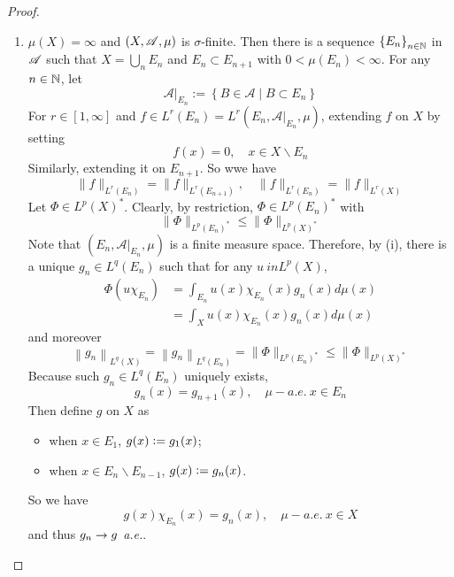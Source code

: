 \begin{proof}
\begin{itemize}
\begin{enumerate}[label=(\roman*)]
			\item $\mu(X) = \infty$ and $(X,\mathscr{A}, \mu)$ is $\sigma$-finite. Then there is a sequence $\left\{E_n\right\}_{n \in \mathbb{N}}$ in $\mathscr{A}$ such that $X = \bigcup_n E_n$ and $E_n \subset E_{n+1}$ with $0 < \mu(E_n) < \infty$. For any $n \in \mathbb{N}$, let
			\begin{equation*}
				\left.\mathscr{A}\right|_{E_n}:=\left\{B \in \mathscr{A} \mid B \subset E_n\right\}
			\end{equation*}
			For $r \in [1,\infty]$ and $f \in L^r(E_n) = L^r\left(E_n,\left.\mathscr{A}\right|_{E_n}, \mu\right)$, extending $f$ on $X$ by setting
			\begin{equation*}
				f(x) = 0,\quad x \in X \backslash E_n
			\end{equation*}
			Similarly, extending it on $E_{n+1}$. So wwe have
			\begin{equation*}
				\|f\|_{L^r\left(E_n\right)}=\|f\|_{L^r\left(E_{n+1}\right)}, \quad\|f\|_{L^r\left(E_n\right)}=\|f\|_{L^r(X)}
			\end{equation*}
			Let $\Phi \in L^p(X)^*$. Clearly, by restriction, $\Phi \in L^p(E_n)^*$ with
			\begin{equation*}
				\|\Phi\|_{L^p\left(E_n\right)^*} \leq\|\Phi\|_{L^p(X)^*}
			\end{equation*}
			Note that $\left(E_n,\left.\mathscr{A}\right|_{E_n}, \mu\right)$ is a finite measure space. Therefore, by (i), there is a unique $g_n \in L^q(E_n)$ such that for any $u \ in L^p(X)$,
			\begin{equation*}
				\begin{aligned}
					\Phi\left(u \chi_{E_n}\right) & =\int_{E_n} u(x) \chi_{E_n}(x) g_n(x) d \mu(x) \\
					& =\int_X u(x) \chi_{E_n}(x) g_n(x) d \mu(x)
				\end{aligned}
			\end{equation*}
			and moreover
			\begin{equation*}
				\left\|g_n\right\|_{L^q(X)}=\left\|g_n\right\|_{L^q\left(E_n\right)}=\|\Phi\|_{L^p\left(E_n\right)^*} \leq\|\Phi\|_{L^p(X)^*}
			\end{equation*}
			Because such $g_n \in L^q(E_n)$ uniquely exists,
			\begin{equation*}
				g_n(x)=g_{n+1}(x), \quad \mu-a.e.~ x \in E_n
			\end{equation*}
			Then define $g$ on $X$ as
			\begin{itemize}
				\item when $x \in E_1$, $g(x) \vcentcolon= g_1(x)$;
				\item when $x \in E_n \backslash E_{n-1}$, $g(x) \vcentcolon= g_n(x)$.
			\end{itemize}
			So we have
			\begin{equation*}
				g(x) \chi_{E_n}(x)=g_n(x),\quad \mu-a.e.~ x \in X
			\end{equation*}
			and thus $g_n \rightarrow g$ \emph{a.e.}.


\end{enumerate}
\end{itemize}
\end{proof}

